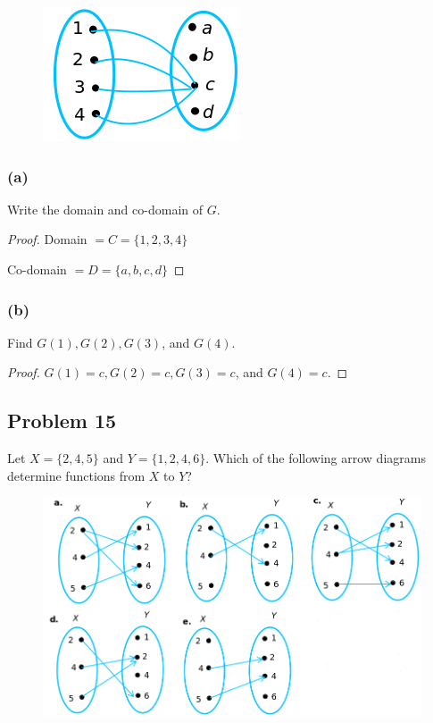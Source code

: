 \documentclass[14pt]{extarticle}
\begin{document}
\begin{figure}[ht!]
\centering
\includegraphics[scale=0.5]{../images/1.3.14.png}
\end{figure}

\subsubsection{(a)}
Write the domain and co-domain of $G$.

\begin{proof}
Domain $ = C = \{1, 2, 3, 4\}$

Co-domain $ = D = \{a, b, c, d\}$
\end{proof}

\subsubsection{(b)}
Find $G(1), G(2), G(3)$, and $G(4)$.

\begin{proof}
$G(1) = c, G(2) = c, G(3) = c$, and $G(4) = c$.
\end{proof}

\subsection{Problem 15}
Let $X = \{2, 4, 5\}$ and $Y = \{1, 2, 4, 6\}$. Which of the following arrow
diagrams determine functions from $X$ to $Y$?

\begin{figure}[ht!]
\centering
\includegraphics[scale=0.5]{../images/1.3.15.png}
\end{figure}
\end{document}
